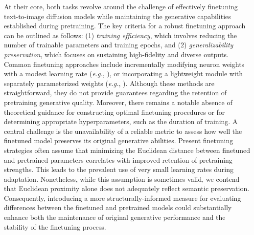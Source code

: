 At their core, both tasks revolve around the challenge of effectively finetuning text-to-image diffusion models while maintaining the generative capabilities established during pretraining. The key criteria for a robust finetuning approach can be outlined as follows: (1) \emph{training efficiency}, which involves reducing the number of trainable parameters and training epochs, and (2) \emph{generalizability preservation}, which focuses on sustaining high-fidelity and diverse outputs. Common finetuning approaches include incrementally modifying neuron weights with a modest learning rate (\emph{e.g.}, \cite{ruiz2023dreambooth}), or incorporating a lightweight module with separately parameterized weights (\emph{e.g.}, \cite{hulora2022,zhang2023adding}). Although these methods are straightforward, they do not provide guarantees regarding the retention of pretraining generative quality. Moreover, there remains a notable absence of theoretical guidance for constructing optimal finetuning procedures or for determining appropriate hyperparameters, such as the duration of training. A central challenge is the unavailability of a reliable metric to assess how well the finetuned model preserves its original generative abilities. Present finetuning strategies often assume that minimizing the Euclidean distance between finetuned and pretrained parameters correlates with improved retention of pretraining strengths. This leads to the prevalent use of very small learning rates during adaptation. Nonetheless, while this assumption is sometimes valid, we contend that Euclidean proximity alone does not adequately reflect semantic preservation. Consequently, introducing a more structurally-informed measure for evaluating differences between the finetuned and pretrained models could substantially enhance both the maintenance of original generative performance and the stability of the finetuning process.

